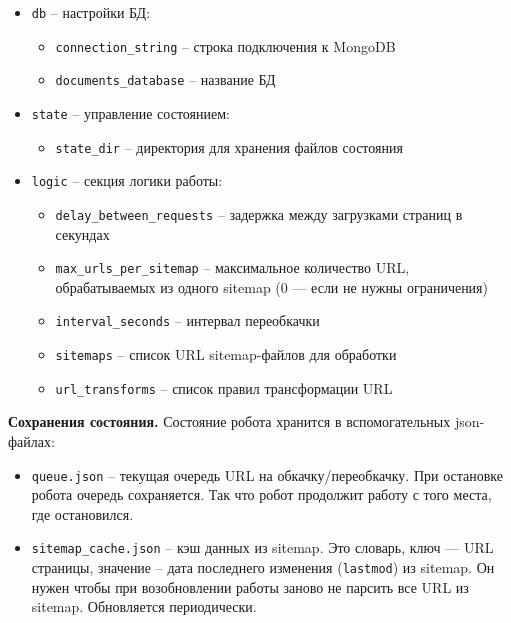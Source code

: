 \begin{itemize}
    \item \texttt{db} -- настройки БД:
    \begin{itemize}
        \item \texttt{connection\_string} -- строка подключения к MongoDB
        \item \texttt{documents\_database} -- название БД
    \end{itemize}
    
    \item \texttt{state} -- управление состоянием:
    \begin{itemize}
        \item \texttt{state\_dir} -- директория для хранения файлов состояния
    \end{itemize}
    
    \item \texttt{logic} -- секция логики работы:
    \begin{itemize}
        \item \texttt{delay\_between\_requests} -- задержка между загрузками страниц в секундах
        \item \texttt{max\_urls\_per\_sitemap} -- максимальное количество URL, обрабатываемых из одного sitemap (0 — если не нужны ограничения)
        \item \texttt{interval\_seconds} -- интервал переобкачки
        \item \texttt{sitemaps} -- список URL sitemap-файлов для обработки
        \item \texttt{url\_transforms} -- список правил трансформации URL
    \end{itemize}
\end{itemize}

\vspace{1 em}
\noindent\textbf{Сохранения состояния.} Состояние робота хранится в вспомогательных json-файлах:

\begin{itemize}
    \item \texttt{queue.json} -- текущая очередь URL на обкачку/переобкачку. При остановке робота очередь сохраняется. Так что робот продолжит работу с того места, где остановился.
    
    \item \texttt{sitemap\_cache.json} -- кэш данных из sitemap. Это словарь, ключ — URL страницы, значение -- дата последнего изменения (\texttt{lastmod}) из sitemap. Он нужен чтобы при возобновлении работы заново не парсить все URL из sitemap. Обновляется периодически.
\end{itemize}


